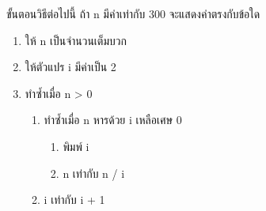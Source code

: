﻿%
\question ขั้นตอนวิธีต่อไปนี้ ถ้า n มีค่าเท่ากับ 300 จะแสดงค่าตรงกับข้อใด
\begin{pseudocode}
\begin{enumerate}
    \item ให้ n เป็นจำนวนเต็มบวก 
    \item ให้ตัวแปร i มีค่าเป็น 2 
    \item ทำซ้ำเมื่อ n > 0
    \begin{enumerate}
        \item ทำซ้ำเมื่อ n หารด้วย i เหลือเศษ 0
        \begin{enumerate}
            \item พิมพ์ i
            \item n เท่ากับ n / i
        \end{enumerate}
        \item i เท่ากับ i + 1
    \end{enumerate}
\end{enumerate}
\end{pseudocode}
